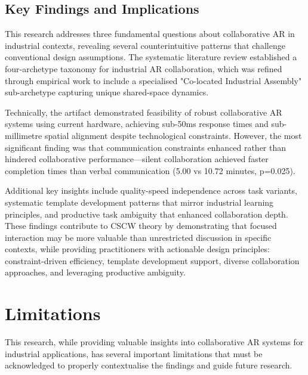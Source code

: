 \subsection{Key Findings and Implications}

This research addresses three fundamental questions about collaborative AR in industrial contexts, revealing several counterintuitive patterns that challenge conventional design assumptions. The systematic literature review established a four-archetype taxonomy for industrial AR collaboration, which was refined through empirical work to include a specialised "Co-located Industrial Assembly" sub-archetype capturing unique shared-space dynamics.

Technically, the artifact demonstrated feasibility of robust collaborative AR systems using current hardware, achieving sub-50ms response times and sub-millimetre spatial alignment despite technological constraints. However, the most significant finding was that communication constraints enhanced rather than hindered collaborative performance—silent collaboration achieved faster completion times than verbal communication (5.00 vs 10.72 minutes, p=0.025).

Additional key insights include quality-speed independence across task variants, systematic template development patterns that mirror industrial learning principles, and productive task ambiguity that enhanced collaboration depth. These findings contribute to CSCW theory by demonstrating that focused interaction may be more valuable than unrestricted discussion in specific contexts, while providing practitioners with actionable design principles: constraint-driven efficiency, template development support, diverse collaboration approaches, and leveraging productive ambiguity.

\section{Limitations}

This research, while providing valuable insights into collaborative AR systems for industrial applications, has several important limitations that must be acknowledged to properly contextualise the findings and guide future research.

